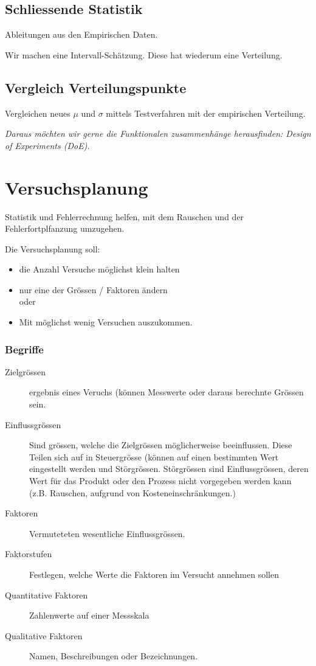 \subsection{Schliessende Statistik}

Ableitungen aus den Empirischen Daten.

Wir machen eine Intervall-Schätzung. Diese hat wiederum eine Verteilung.


\subsection{Vergleich Verteilungspunkte}

Vergleichen neues $\mu$ und $\sigma$ mittels Testverfahren mit der empirischen Verteilung.

\emph{Daraus möchten wir gerne die Funktionalen zusammenhänge herausfinden: Design of Experiments (DoE).}

\section{Versuchsplanung}

Statistik und Fehlerrechnung helfen, mit dem Rauschen und der Fehlerfortplfanzung umzugehen.

Die Versuchsplanung soll:

\begin{itemize}
\item die Anzahl Versuche möglichst klein halten
\item nur eine der Grössen / Faktoren ändern \\
oder
\item Mit möglichst wenig Versuchen auszukommen.
\end{itemize}

\subsubsection{Begriffe}
\begin{description}
\item[Zielgrössen] ergebnis eines Veruchs (können Messwerte oder daraus berechnte Grössen sein.

\item[Einflussgrössen] Sind grössen, welche die Zielgrössen möglicherweise beeinflussen. Diese Teilen sich auf in Steuergrösse (können auf einen bestimmten Wert eingestellt werden und Störgrössen.
Störgrössen sind Einflussgrössen, deren Wert für das Produkt oder den Prozess nicht vorgegeben werden kann (z.B. Rauschen, aufgrund von Kosteneinschränkungen.)
\item[Faktoren] Vermuteteten wesentliche Einflussgrössen.
\item[Faktorstufen] Festlegen, welche Werte die Faktoren im Versucht annehmen sollen
\item[Quantitative Faktoren] Zahlenwerte auf einer Messskala
\item[Qualitative Faktoren] Namen, Beschreibungen oder Bezeichnungen.
\end{description}

